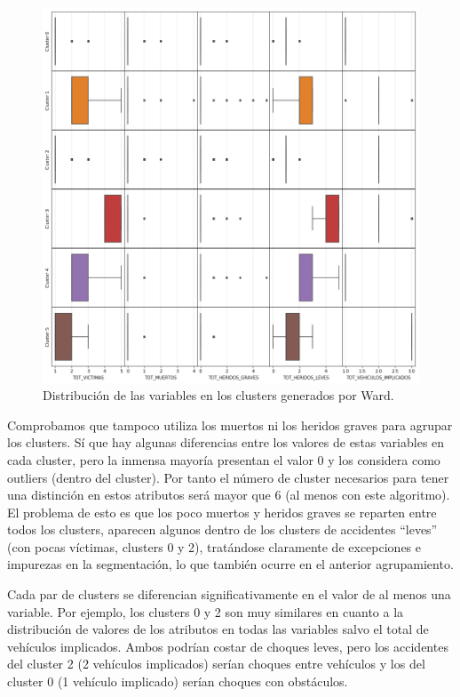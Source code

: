 \documentclass[oneside]{book}
\begin{document}
\begin{figure}[H]
  \centering
  \includegraphics[width=125mm]{figures/accidentes/ward1distribution}
  \caption{Distribución de las variables en los clusters generados por
    Ward.}
  \label{fig:ward1distribution}
\end{figure}

Comprobamos que tampoco utiliza los muertos ni los heridos graves para
agrupar los clusters. Sí que hay algunas diferencias entre los valores
de estas variables en cada cluster, pero la inmensa mayoría presentan
el valor 0 y los considera como outliers (dentro del cluster). Por
tanto el número de cluster necesarios para tener una distinción en
estos atributos será mayor que 6 (al menos con este algoritmo). El
problema de esto es que los poco muertos y heridos graves se reparten
entre todos los clusters, aparecen algunos dentro de los clusters de
accidentes ``leves'' (con pocas víctimas, clusters 0 y 2), tratándose
claramente de excepciones e impurezas en la segmentación, lo que
también ocurre en el anterior agrupamiento.

Cada par de clusters se diferencian significativamente en el valor de
al menos una variable. Por ejemplo, los clusters 0 y 2 son muy
similares en cuanto a la distribución de valores de los atributos en
todas las variables salvo el total de vehículos implicados. Ambos
podrían costar de choques leves, pero los accidentes del cluster 2 (2
vehículos implicados) serían choques entre vehículos y los del cluster
0 (1 vehículo implicado) serían choques con obstáculos.
\end{document}

